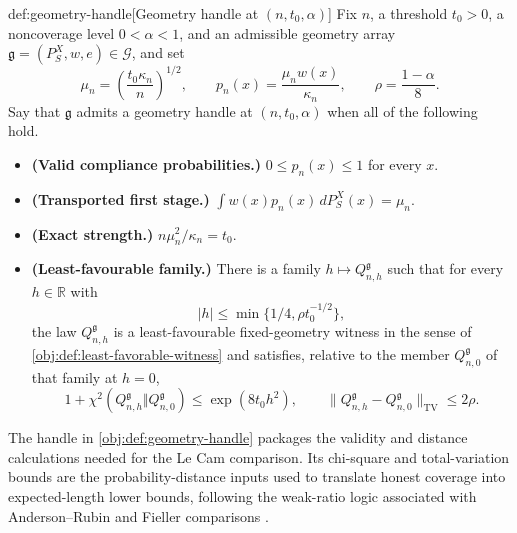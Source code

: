 \begin{definitionv}{def:geometry-handle}[Geometry handle at \((n,t_0,\alpha)\)]
Fix \(n\), a threshold \(t_0>0\), a noncoverage level \(0<\alpha<1\), and an admissible geometry array \(\mathfrak g=(P_S^X,w,e)\in\mathcal G\), and set
\[
\mu_n=\left(\frac{t_0\kappa_n}{n}\right)^{1/2},
\qquad
p_n(x)=\frac{\mu_n w(x)}{\kappa_n},
\qquad
\rho=\frac{1-\alpha}{8}.
\]
Say that \(\mathfrak g\) admits a geometry handle at \((n,t_0,\alpha)\) when all of the following hold.
\begin{itemize}
\item \textbf{(Valid compliance probabilities.)} \(0\le p_n(x)\le 1\) for every \(x\).
\item \textbf{(Transported first stage.)} \(\int w(x)p_n(x)\,dP_S^X(x)=\mu_n\).
\item \textbf{(Exact strength.)} \(n\mu_n^2/\kappa_n=t_0\).
\item \textbf{(Least-favourable family.)} There is a family \(h\mapsto Q_{n,h}^{\mathfrak g}\) such that for every \(h\in\mathbb R\) with
\[
|h|\le \min\{1/4,\rho t_0^{-1/2}\},
\]
the law \(Q_{n,h}^{\mathfrak g}\) is a least-favourable fixed-geometry witness in the sense of \cref{obj:def:least-favorable-witness} and satisfies, relative to the member \(Q_{n,0}^{\mathfrak g}\) of that family at \(h=0\),
\[
1+\chi^2(Q_{n,h}^{\mathfrak g}\Vert Q_{n,0}^{\mathfrak g})\le\exp(8t_0h^2),
\qquad
\|Q_{n,h}^{\mathfrak g}-Q_{n,0}^{\mathfrak g}\|_{\mathrm{TV}}\le2\rho.
\]
\end{itemize}
\end{definitionv}

The handle in \cref{obj:def:geometry-handle} packages the validity and distance calculations needed for the Le Cam comparison. Its chi-square and total-variation bounds are the probability-distance inputs used to translate honest coverage into expected-length lower bounds, following the weak-ratio logic associated with Anderson--Rubin and Fieller comparisons \citep{AndersonRubin1949,Fieller1954,GleserHwang1987,Dufour1997}.

